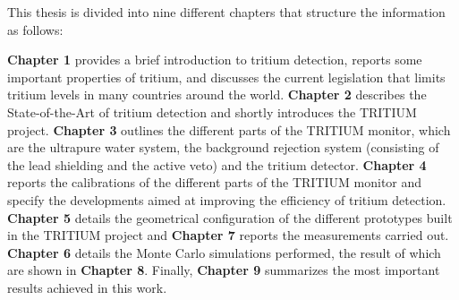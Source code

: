 This thesis is divided into nine different chapters that structure the information as follows:

\textbf{Chapter 1} provides a brief introduction to tritium detection, reports some important properties of tritium, and discusses the current legislation that limits tritium levels in many countries around the world. \textbf{Chapter 2} describes the State-of-the-Art of tritium detection and shortly introduces the TRITIUM project. \textbf{Chapter 3} outlines the different parts of the TRITIUM monitor, which are the ultrapure water system, the background rejection system (consisting of the lead shielding and the active veto)  and the tritium detector. \textbf{Chapter 4} reports the calibrations of the different parts of the TRITIUM monitor and specify the developments aimed at improving the efficiency of tritium detection. \textbf{Chapter 5} details the geometrical configuration of the different prototypes built in the TRITIUM project and \textbf{Chapter 7} reports the measurements carried out. \textbf{Chapter 6} details the Monte Carlo simulations performed, the result of which are shown in \textbf{Chapter 8}. Finally, \textbf{Chapter 9} summarizes the most important results achieved in this work.